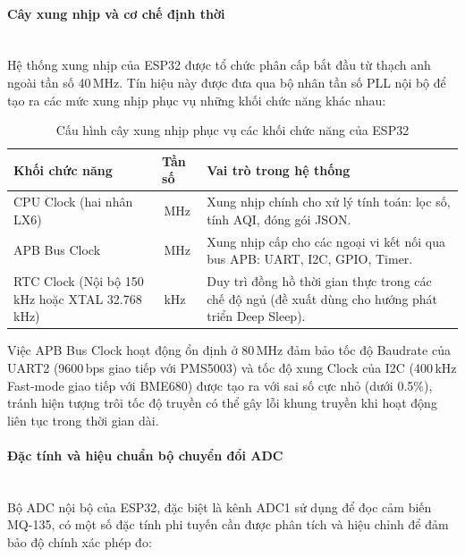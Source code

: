 \documentclass[12pt,a4paper]{article}
\begin{document}
\paragraph{Cây xung nhịp và cơ chế định thời}\mbox{}\\

Hệ thống xung nhịp của ESP32 được tổ chức phân cấp bắt đầu từ thạch anh ngoài tần số 40\,MHz. Tín hiệu này được đưa qua bộ nhân tần số PLL nội bộ để tạo ra các mức xung nhịp phục vụ những khối chức năng khác nhau:

\begin{table}[H]
\centering\small
\caption{Cấu hình cây xung nhịp phục vụ các khối chức năng của ESP32}
\label{tab:clock_tree}
\begin{tabular}{|>{\raggedright\arraybackslash}p{4.0cm}|>{\raggedright\arraybackslash}p{2.5cm}|>{\raggedright\arraybackslash}p{6.5cm}|}
\hline
\textbf{Khối chức năng} & \textbf{Tần số} & \textbf{Vai trò trong hệ thống} \\ 
        \hline
CPU Clock (hai nhân LX6) & 240\,MHz & Xung nhịp chính cho xử lý tính toán: lọc số, tính AQI, đóng gói JSON. \\ 
        \hline
APB Bus Clock & 80\,MHz & Xung nhịp cấp cho các ngoại vi kết nối qua bus APB: UART, I2C, GPIO, Timer. \\ 
        \hline
RTC Clock (Nội bộ 150\,kHz hoặc XTAL 32.768\,kHz) & 32.768\,kHz & Duy trì đồng hồ thời gian thực trong các chế độ ngủ (đề xuất dùng cho hướng phát triển Deep Sleep). \\ 
        \hline\end{tabular}
\end{table}

Việc APB Bus Clock hoạt động ổn định ở 80\,MHz đảm bảo tốc độ Baudrate của UART2 (9600\,bps giao tiếp với PMS5003) và tốc độ xung Clock của I2C (400\,kHz Fast-mode giao tiếp với BME680) được tạo ra với sai số cực nhỏ (dưới 0.5\%), tránh hiện tượng trôi tốc độ truyền có thể gây lỗi khung truyền khi hoạt động liên tục trong thời gian dài.

\paragraph{Đặc tính và hiệu chuẩn bộ chuyển đổi ADC}\mbox{}\\

Bộ ADC nội bộ của ESP32, đặc biệt là kênh ADC1 sử dụng để đọc cảm biến MQ-135, có một số đặc tính phi tuyến cần được phân tích và hiệu chỉnh để đảm bảo độ chính xác phép đo:
\end{document}
